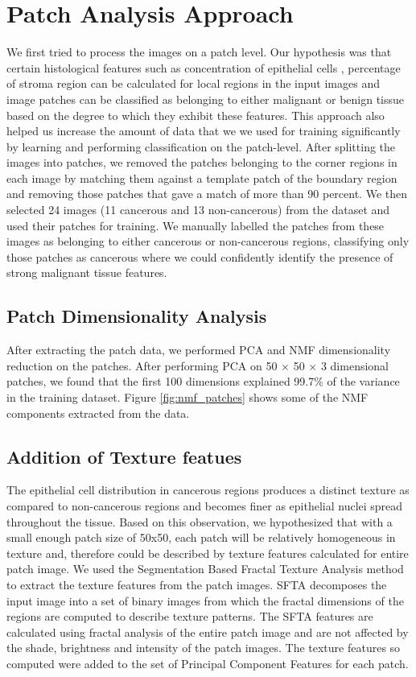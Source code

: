 \section{Patch Analysis Approach}
\label{sec:patch_based_approaches}
We first tried to process the images on a patch level. Our hypothesis was that certain histological features such as concentration of epithelial cells , percentage of stroma region can be calculated for local regions in the input images and image patches can be classified as belonging to either malignant or benign tissue based on the degree to which they exhibit these features. This approach also helped us increase the amount of data that we we used for training significantly by learning and performing classification on the patch-level. After splitting the images into patches, we removed the patches belonging to the corner regions in each image by matching them against a template patch of the boundary region and removing those patches that gave a match of more than 90 percent. We then selected 24 images (11 cancerous and 13 non-cancerous) from the dataset and used their patches for training. We manually labelled the patches from these images as belonging to either cancerous or non-cancerous regions, classifying only those patches as cancerous where we could confidently identify the presence of strong malignant tissue features. 

\subsection{Patch Dimensionality Analysis}
After extracting the patch data, we performed PCA and NMF dimensionality reduction on the patches. After performing PCA on 50 $\times$ 50 $\times$ 3 dimensional patches, we found that the first 100 dimensions explained 99.7\% of the variance in the training dataset. Figure \ref{fig:nmf_patches} shows some of the NMF components extracted from the data. 


\subsection{Addition of Texture featues}
The epithelial cell distribution in cancerous regions produces a distinct texture as compared to non-cancerous regions and becomes finer as epithelial nuclei spread throughout the tissue. Based on this observation, we hypothesized that with a small enough patch size of 50x50, each patch will be relatively homogeneous in texture and, therefore could be described by texture features calculated for entire patch image. We used the Segmentation Based Fractal Texture Analysis method \cite{6382737} to extract the texture features from the patch images. SFTA decomposes the input image into a set of binary images from  which the fractal dimensions of the regions are computed to describe texture patterns. The SFTA features are calculated using fractal analysis of the entire patch image and are not affected by the shade, brightness and intensity of the patch images. The texture features so computed were added to the set of Principal Component Features for each patch.


